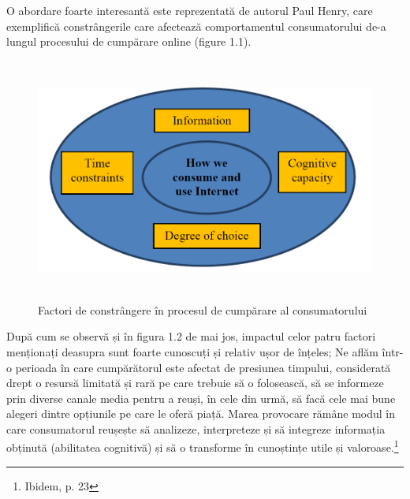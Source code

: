 \documentclass[a4paper, 12pt]{article}
\begin{document}
	\quad O abordare foarte interesantă este reprezentată de autorul Paul Henry, care exemplifică constrângerile care afectează comportamentul consumatorului de-a lungul procesului de cumpărare online (figure 1.1).
	\begin{figure}[!htb]
		\centering
		\includegraphics[width=13cm, height=8cm]{"figures/first.png"}
		\caption{Factori de constrângere în procesul de cumpărare al consumatorului}\label{fig:first}
	\end{figure}

	\quad După cum se observă și în figura 1.2 de mai jos, impactul celor patru factori menționați deasupra sunt foarte cunoscuți și relativ ușor de înțeles; Ne aflăm într-o perioada în care cumpărătorul este afectat de presiunea timpului, considerată drept o resursă limitată și rară pe care trebuie să o folosească, să se informeze prin diverse canale media pentru a reuși, în cele din urmă, să facă cele mai bune alegeri dintre opțiunile pe care le oferă piață. Marea provocare rămâne modul în care consumatorul reușește să analizeze, interpreteze și să integreze informația obținută (abilitatea cognitivă) și să o transforme în cunoștințe utile și valoroase.\footnote{Ibidem, p. 23}
	
\end{document}
